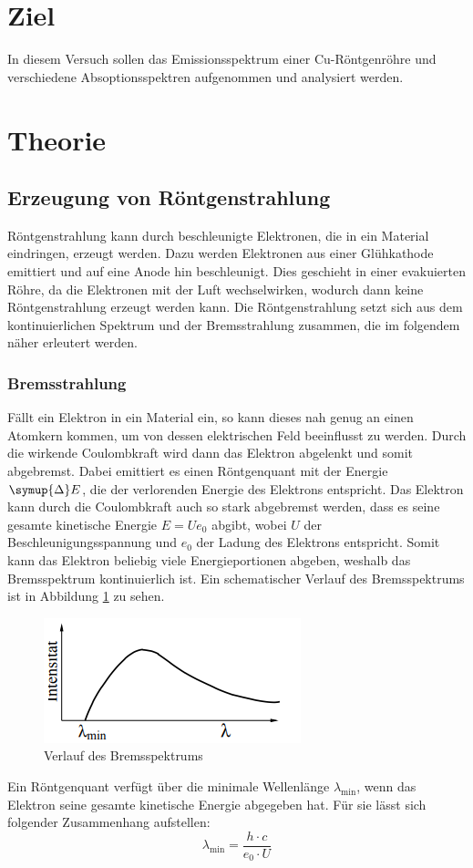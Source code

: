 \section{Ziel}
In diesem Versuch sollen das Emissionsspektrum einer Cu-Röntgenröhre und verschiedene Absoptionsspektren
aufgenommen und analysiert werden.

\section{Theorie}

\subsection{Erzeugung von Röntgenstrahlung}
Röntgenstrahlung kann durch beschleunigte Elektronen, die in ein Material eindringen, erzeugt werden. Dazu werden Elektronen aus einer Glühkathode emittiert und auf eine Anode hin beschleunigt.
Dies geschieht in einer evakuierten Röhre, da die Elektronen mit der Luft wechselwirken, wodurch dann keine Röntgenstrahlung erzeugt werden kann.
Die Röntgenstrahlung setzt sich aus dem kontinuierlichen Spektrum und der Bremsstrahlung zusammen, die im folgendem näher erleutert werden.

\subsubsection{Bremsstrahlung}
Fällt ein Elektron in ein Material ein, so kann dieses nah genug an einen Atomkern kommen, um von dessen elektrischen Feld beeinflusst zu werden. Durch die wirkende Coulombkraft wird dann das Elektron abgelenkt
und somit abgebremst. Dabei emittiert es einen Röntgenquant mit der Energie $\symup{\Delta} E$, die der verlorenden Energie des Elektrons entspricht.
Das Elektron kann durch die Coulombkraft auch so stark abgebremst werden, dass es seine gesamte kinetische Energie $E=U e_0$ abgibt, wobei $U$ der Beschleunigungsspannung und $e_0$ der Ladung des Elektrons entspricht.
Somit kann das Elektron beliebig viele Energieportionen abgeben, weshalb das Bremsspektrum kontinuierlich ist.
Ein schematischer Verlauf des Bremsspektrums ist in Abbildung \ref{fig:brems} zu sehen.
\begin{figure}
  \centering
  \includegraphics{Text/Bilder/Brems.png}
  \caption{Verlauf des Bremsspektrums \cite[1]{sample}}
  \label{fig:brems}
\end{figure}
Ein Röntgenquant verfügt über die minimale Wellenlänge $\lambda_\text{min}$, wenn das Elektron seine gesamte kinetische Energie abgegeben hat. Für sie lässt sich folgender Zusammenhang aufstellen:
\begin{equation}
  \lambda_\text{min}=\frac{h \cdot c}{e_0 \cdot U}
  \label{eqn:min}
\end{equation}

